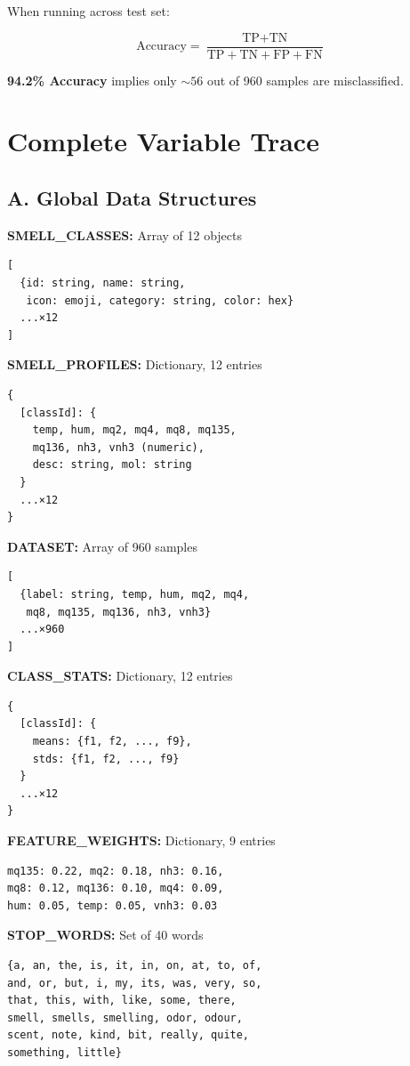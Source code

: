 \documentclass[10pt]{article}
\begin{document}
{When running across test set:

\[
\text{Accuracy} = \frac{\text{TP} + \text{TN}}{\text{TP} + \text{TN} + \text{FP} + \text{FN}}
\]

\textbf{94.2\% Accuracy} implies only $\sim 56$ out of 960 samples are misclassified.

\newpage
\section*{Complete Variable Trace}

\subsection*{A. Global Data Structures}

\textbf{SMELL\_CLASSES:} Array of 12 objects
\begin{verbatim}
[
  {id: string, name: string, 
   icon: emoji, category: string, color: hex}
  ...×12
]
\end{verbatim}

\textbf{SMELL\_PROFILES:} Dictionary, 12 entries
\begin{verbatim}
{
  [classId]: {
    temp, hum, mq2, mq4, mq8, mq135, 
    mq136, nh3, vnh3 (numeric),
    desc: string, mol: string
  }
  ...×12
}
\end{verbatim}

\textbf{DATASET:} Array of 960 samples
\begin{verbatim}
[
  {label: string, temp, hum, mq2, mq4,
   mq8, mq135, mq136, nh3, vnh3}
  ...×960
]
\end{verbatim}

\textbf{CLASS\_STATS:} Dictionary, 12 entries
\begin{verbatim}
{
  [classId]: {
    means: {f1, f2, ..., f9},
    stds: {f1, f2, ..., f9}
  }
  ...×12
}
\end{verbatim}

\textbf{FEATURE\_WEIGHTS:} Dictionary, 9 entries
\begin{verbatim}
mq135: 0.22, mq2: 0.18, nh3: 0.16,
mq8: 0.12, mq136: 0.10, mq4: 0.09,
hum: 0.05, temp: 0.05, vnh3: 0.03
\end{verbatim}

\textbf{STOP\_WORDS:} Set of 40 words
\begin{verbatim}
{a, an, the, is, it, in, on, at, to, of,
and, or, but, i, my, its, was, very, so,
that, this, with, like, some, there,
smell, smells, smelling, odor, odour,
scent, note, kind, bit, really, quite,
something, little}
\end{verbatim}

}
\end{document}
